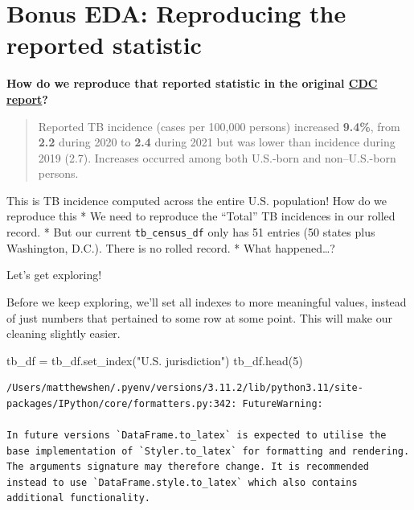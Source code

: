 \documentclass[
  letterpaper,
  DIV=11,
  numbers=noendperiod]{scrreprt}
\newenvironment{Shaded}{\begin{snugshade}}{\end{snugshade}}
\newcommand{\DecValTok}[1]{\textcolor[rgb]{0.68,0.00,0.00}{#1}}
\newcommand{\NormalTok}[1]{\textcolor[rgb]{0.00,0.23,0.31}{#1}}
\newcommand{\OperatorTok}[1]{\textcolor[rgb]{0.37,0.37,0.37}{#1}}
\newcommand{\StringTok}[1]{\textcolor[rgb]{0.13,0.47,0.30}{#1}}
\begin{document}
\hypertarget{bonus-eda-reproducing-the-reported-statistic}{%
\section{Bonus EDA: Reproducing the reported
statistic}\label{bonus-eda-reproducing-the-reported-statistic}}

\textbf{How do we reproduce that reported statistic in the original
\href{https://www.cdc.gov/mmwr/volumes/71/wr/mm7112a1.htm?s_cid=mm7112a1_w}{CDC
report}?}

\begin{quote}
Reported TB incidence (cases per 100,000 persons) increased
\textbf{9.4\%}, from \textbf{2.2} during 2020 to \textbf{2.4} during
2021 but was lower than incidence during 2019 (2.7). Increases occurred
among both U.S.-born and non--U.S.-born persons.
\end{quote}

This is TB incidence computed across the entire U.S. population! How do
we reproduce this * We need to reproduce the ``Total'' TB incidences in
our rolled record. * But our current \texttt{tb\_census\_df} only has 51
entries (50 states plus Washington, D.C.). There is no rolled record. *
What happened\ldots?

Let's get exploring!

Before we keep exploring, we'll set all indexes to more meaningful
values, instead of just numbers that pertained to some row at some
point. This will make our cleaning slightly easier.

\begin{Shaded}
\begin{Highlighting}[]
\NormalTok{tb\_df }\OperatorTok{=}\NormalTok{ tb\_df.set\_index(}\StringTok{"U.S. jurisdiction"}\NormalTok{)}
\NormalTok{tb\_df.head(}\DecValTok{5}\NormalTok{)}
\end{Highlighting}
\end{Shaded}

\begin{verbatim}
/Users/matthewshen/.pyenv/versions/3.11.2/lib/python3.11/site-packages/IPython/core/formatters.py:342: FutureWarning:

In future versions `DataFrame.to_latex` is expected to utilise the base implementation of `Styler.to_latex` for formatting and rendering. The arguments signature may therefore change. It is recommended instead to use `DataFrame.style.to_latex` which also contains additional functionality.
\end{verbatim}
\end{document}

